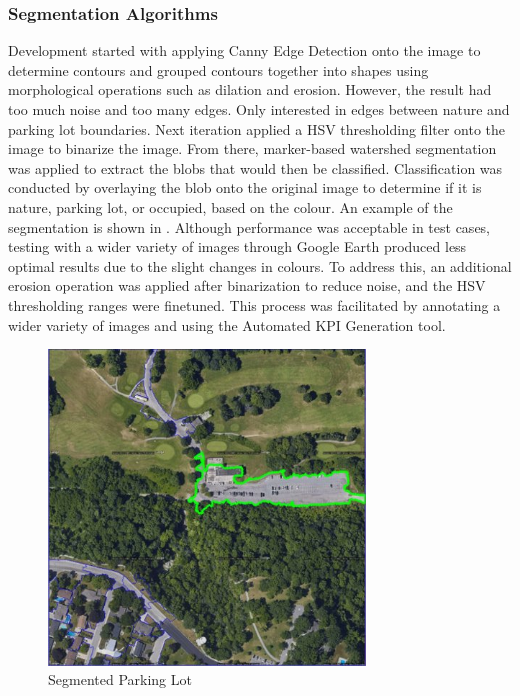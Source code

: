 \documentclass{article}
\begin{document}
\clearpage

\subsubsection{Segmentation Algorithms}
Development started with applying Canny Edge Detection onto the image to determine contours and grouped contours together into shapes using morphological operations such as dilation and erosion.
However, the result had too much noise and too many edges. Only interested in edges between nature and parking lot boundaries.
Next iteration applied a HSV thresholding filter onto the image to binarize the image. From there, marker-based watershed segmentation was applied to extract the blobs that would then be classified. Classification was conducted by overlaying the blob onto the original image to determine if it is nature, parking lot, or occupied, based on the colour. 
An example of the segmentation is shown in .
Although performance was acceptable in test cases, testing with a wider variety of images through Google Earth produced less optimal results due to the slight changes in colours. To address this, an additional erosion operation was applied after binarization to reduce noise, and the HSV thresholding ranges were finetuned. This process was facilitated by annotating a wider variety of images and using the Automated KPI Generation tool.

\begin{figure}[h!]
  \begin{center} 
  \caption{Segmented Parking Lot}
  \label{fig:SegmentedParking}
        \includegraphics[width=0.75\textwidth]{Reflection/SegmentedParking.png}
  \end{center}
\end{figure}
\end{document}
